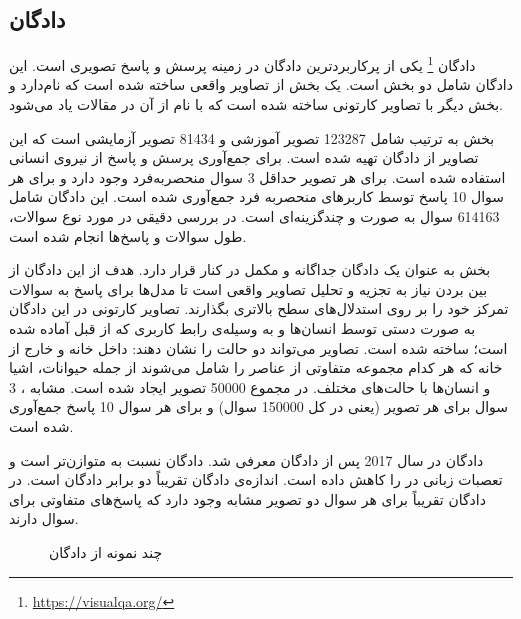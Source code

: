 \subsection{ دادگان }
دادگان
 \footnote{\href{https://visualqa.org/}{https://visualqa.org/}} \cite{antol2015vqa}
یکی از پرکاربردترین ‌‌دادگان در زمینه پرسش و پاسخ تصویری است. این دادگان شامل دو بخش است. یک بخش از تصاویر واقعی ساخته ‌شده ‌است که
 نام‌دارد و بخش دیگر با تصاویر کارتونی ساخته ‌شده ‌است که با نام 
 از آن در مقالات یاد می‌شود. 
 
 بخش
 به ترتیب شامل 123287 تصویر آموزشی و 81434 تصویر آزمایشی است که این تصاویر از ‌دادگان
 \cite{lin2014microsoft}
  تهیه شده است.  برای جمع‌آوری پرسش و پاسخ از نیروی انسانی استفاده ‌شده‌ است. برای هر تصویر حداقل 3 سوال منحصربه‌فرد وجود دارد و برای هر سوال 10 پاسخ توسط کاربرهای منحصربه فرد جمع‌آوری ‌شده ‌است. این دادگان شامل 614163 سوال به صورت 
  و چندگزینه‌ای است. در 
  \cite{antol2015vqa}
  بررسی دقیقی در مورد نوع سوالات، طول سوالات و پاسخ‌ها انجام ‌شده ‌است.
  
  بخش
 به عنوان یک ‌دادگان جداگانه و مکمل در کنار
 قرار دارد. هدف از این ‌دادگان از بین بردن نیاز به تجزیه و تحلیل تصاویر واقعی است تا مدل‌ها برای پاسخ به سوالات تمرکز خود را بر روی استدلال‌های سطح بالاتری بگذارند. تصاویر کارتونی در این دادگان به صورت دستی توسط انسان‌ها و به وسیله‌ی رابط کاربری که از قبل آماده ‌شده‌ است؛ ساخته ‌شده ‌است. تصاویر می‌تواند دو حالت را نشان‌ دهند: داخل خانه و خارج از خانه که هر کدام مجموعه متفاوتی از عناصر را شامل می‌شوند از جمله حیوانات، اشیا و انسان‌ها با حالت‌های مختلف. در مجموع 50000 تصویر ایجاد ‌شده ‌است. مشابه 
 ، 3 سوال برای هر تصویر (یعنی در کل 150000 سوال) و برای هر سوال 10 پاسخ  جمع‌آوری ‌شده ‌است.
 
 ‌دادگان 
 \cite{goyal2017making}
در سال 2017 پس از دادگان 
معرفی شد. دادگان
نسبت به 
متوازن‌تر است و تعصبات زبانی در 
را کاهش داده است. اندازه‌ی دادگان
تقریباً دو برابر ‌‌دادگان 
است. در دادگان
تقریباً برای هر سوال دو تصویر مشابه وجود دارد که پاسخ‌های متفاوتی برای سوال دارند.

  \begin{figure}
	\caption[چند نمونه ازدادگان  ]{چند نمونه از دادگان  \cite{antol2015vqa}}
	\label{fig:vqa1realExample}
  \end{figure}

